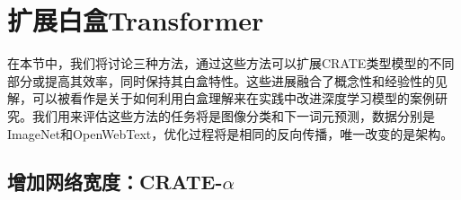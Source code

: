 \documentclass[../../book-main.tex]{subfiles}
\begin{document}




\section{扩展白盒Transformer}\label{sec:scalable}

在本节中，我们将讨论三种方法，通过这些方法可以扩展CRATE类型模型的不同部分或提高其效率，同时保持其白盒特性。这些进展融合了概念性和经验性的见解，可以被看作是关于如何利用白盒理解来在实践中改进深度学习模型的案例研究。我们用来评估这些方法的任务将是图像分类和下一词元预测，数据分别是ImageNet和OpenWebText，优化过程将是相同的反向传播，唯一改变的是架构。

\subsection{增加网络宽度：CRATE-\texorpdfstring{\(\alpha\)}{alpha}}\label{sub:crate_alpha_experiments}
\end{document}
